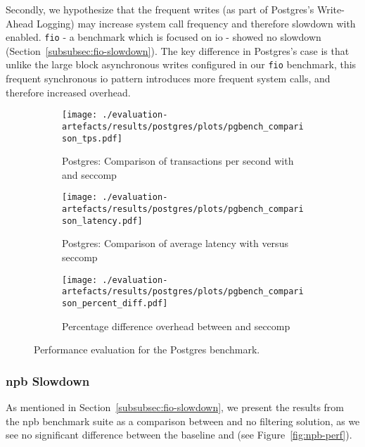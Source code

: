 Secondly, we hypothesize that the frequent writes (as part of Postgres's
Write-Ahead Logging) may increase system call frequency and therefore slowdown
with \af enabled. \texttt{fio} - a benchmark which is focused on \ac{io} -
showed no slowdown (Section~\ref{subsubsec:fio-slowdown}). The key difference in
Postgres's case is that unlike the large block asynchronous writes
configured in our \texttt{fio} benchmark, this frequent synchronous \ac{io}
pattern introduces more frequent system calls, and therefore increased overhead.

\begin{figure}[htbp]
    \centering
    \begin{subfigure}[b]{0.45 \textwidth}
        \centering
        \texttt{[image: ./evaluation-artefacts/results/postgres/plots/pgbench\_comparison\_tps.pdf]} 
        \caption{Postgres: Comparison of transactions per second with \af
        and seccomp}
        \label{fig:pgs-txs}
    \end{subfigure}
    \hfill
     \begin{subfigure}[b]{0.45 \textwidth}
        \centering
        \texttt{[image: ./evaluation-artefacts/results/postgres/plots/pgbench\_comparison\_latency.pdf]} 
        \caption{Postgres: Comparison of average latency with \af versus
        seccomp}
        \label{fig:pgs-time}
    \end{subfigure}
     \medskip 
     \begin{subfigure}[b]{0.45 \textwidth}
        \centering
        \texttt{[image: ./evaluation-artefacts/results/postgres/plots/pgbench\_comparison\_percent\_diff.pdf]} %
        \caption{Percentage difference overhead between \af and seccomp}
        \label{fig:pgs-percdiff}
    \end{subfigure}

    \caption{Performance evaluation for the Postgres benchmark.}
    \label{fig:pgs-perf}
\end{figure}


\subsubsection{\ac{npb} Slowdown}\label{subsubsec:npb-slowdown}

As mentioned in Section~\ref{subsubsec:fio-slowdown}, we present the results
from the \ac{npb} benchmark suite as a comparison between \af and no filtering
solution, as we see no significant difference between the baseline and \af (see
Figure~\ref{fig:npb-perf}).

